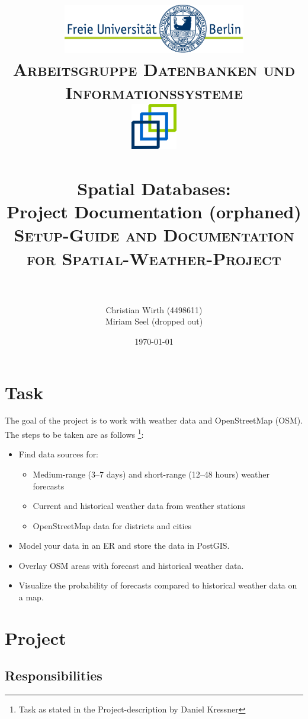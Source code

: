 \documentclass[paper=a4, fontsize=11pt]{article} %
\title{	
\normalfont \normalsize 
\textsc{\includegraphics[width=0.6\textwidth]{pictures/logo} \\ [5pt] Arbeitsgruppe Datenbanken und Informationssysteme \\ [20pt] \includegraphics[width=0.15\textwidth]{pictures/DBIS_Logo_rgb_web.png}} \\ [10pt] %
\horrule{0.5pt} \\[0.4cm] %
\huge Spatial Databases:\\ Project Documentation (orphaned) \\ [0.15cm] %
\normalsize \textsc{Setup-Guide and Documentation for Spatial-Weather-Project} \\ [0.4cm]
\horrule{2pt} \\[0.5cm] %
}
\author{Christian Wirth (4498611) \\ Miriam Seel (dropped out)}
\date{\today}
\numberwithin{equation}{section} %
\numberwithin{figure}{section} %
\numberwithin{table}{section} %
\begin{document}
\begin{titlepage}
\maketitle
\thispagestyle{empty}
\end{titlepage}

\setcounter{page}{1}
\tableofcontents

\newpage
{}
\pagestyle{fancy}
\setcounter{page}{1}
\section{Task}

The goal of the project is to work with weather data and OpenStreetMap (OSM). 
The steps to be taken are as follows \footnote{Task as stated in the Project-description by Daniel Kressner}: 

\begin{itemize}
      \item Find data sources for: 
      \begin{itemize}
         \item Medium-range (3–7 days) and short-range (12–48 hours) weather forecasts
         \item Current and historical weather data from weather stations
         \item OpenStreetMap data for districts and cities
         
      \end{itemize}
      \item Model your data in an ER and store the data in PostGIS.
      \item Overlay OSM areas with forecast and historical weather data.
      \item Visualize the probability of forecasts compared to historical weather data on a map.
   \end{itemize}


\section{Project}
\label{sec:Umsetzung}

\subsection{Responsibilities}
\end{document}
